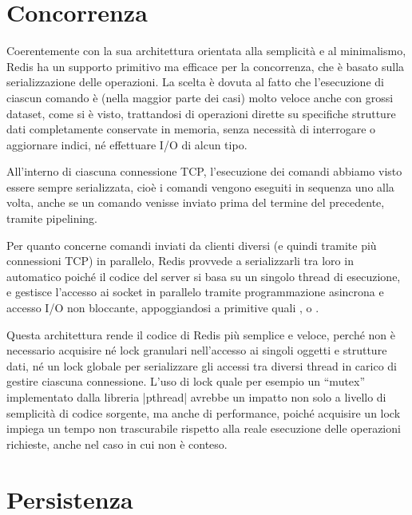 \section{Concorrenza}
\label{sec:concurrency}

Coerentemente con la sua architettura orientata alla semplicità e al minimalismo, Redis ha un
supporto primitivo ma efficace per la concorrenza, che è basato sulla serializzazione delle
operazioni. La scelta è dovuta al fatto che l'esecuzione di ciascun comando è (nella maggior parte
dei casi) molto veloce anche con grossi dataset, come si è visto, trattandosi di operazioni dirette
su specifiche strutture dati completamente conservate in memoria, senza necessità di interrogare o
aggiornare indici, né effettuare I/O di alcun tipo.

All'interno di ciascuna connessione TCP, l'esecuzione dei comandi abbiamo visto essere sempre
serializzata, cioè i comandi vengono eseguiti in sequenza uno alla volta, anche se un comando
venisse inviato prima del termine del precedente, tramite pipelining.

Per quanto concerne comandi inviati da clienti diversi (e quindi tramite più connessioni TCP) in
parallelo, Redis provvede a serializzarli tra loro in automatico poiché il codice del server si
basa su un singolo thread di esecuzione, e gestisce l'accesso ai socket in parallelo tramite
programmazione asincrona e accesso I/O non bloccante, appoggiandosi a primitive quali 
,
 o 
.

Questa architettura rende il codice di Redis più semplice e veloce, perché non è necessario
acquisire né lock granulari nell'accesso ai singoli oggetti e strutture dati, né un lock globale per
serializzare gli accessi tra diversi thread in carico di gestire ciascuna connessione. L'uso di lock
quale per esempio un ``mutex'' implementato dalla libreria \cverb|pthread| avrebbe un impatto non
solo a livello di semplicità di codice sorgente, ma anche di performance, poiché acquisire un lock
impiega un tempo non trascurabile rispetto alla reale esecuzione delle operazioni richieste, anche
nel caso in cui non è conteso.

\section{Persistenza}
\label{sec:persistence}

